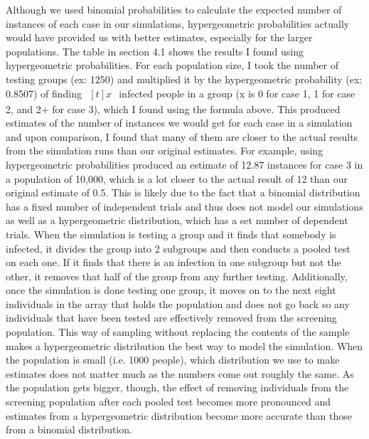 \documentclass[letterpaper, 10pt,DIV=13]{scrartcl}
\numberwithin{equation}{section} %
\numberwithin{figure}{section} %
\numberwithin{table}{section} %
\begin{document}
Although we used binomial probabilities to calculate the expected number of instances of each case in our simulations, hypergeometric probabilities actually would have provided us with better estimates, especially for the larger populations. The table in section 4.1 shows the results I found using hypergeometric probabilities. For each population size, I took the number of testing groups (ex: 1250) and multiplied it by the hypergeometric probability (ex: 0.8507) of finding $\begin{aligned}[t] x \end{aligned}$ infected people in a group (x is 0 for case 1, 1 for case 2, and 2+ for case 3), which I found using the formula above. This produced estimates of the number of instances we would get for each case in a simulation and upon comparison, I found that many of them are closer to the actual results from the simulation runs than our original estimates. For example, using hypergeometric probabilities produced an estimate of 12.87 instances for case 3 in a population of 10,000, which is a lot closer to the actual result of 12 than our original estimate of 0.5. This is likely due to the fact that a binomial distribution has a fixed number of independent trials and thus does not model our simulations as well as a hypergeometric distribution, which has a set number of dependent trials. When the simulation is testing a group and it finds that somebody is infected, it divides the group into 2 subgroups and then conducts a pooled test on each one. If it finds that there is an infection in one subgroup but not the other, it removes that half of the group from any further testing. Additionally, once the simulation is done testing one group, it moves on to the next eight individuals in the array that holds the population and does not go back so any individuals that have been tested are effectively removed from the screening population. This way of sampling without replacing the contents of the sample makes a hypergeometric distribution the best way to model the simulation. When the population is small (i.e. 1000 people), which distribution we use to make estimates does not matter much as the numbers come out roughly the same. As the population gets bigger, though, the effect of removing individuals from the screening population after each pooled test becomes more pronounced and estimates from a hypergeometric distribution become more accurate than those from a binomial distribution.
\end{document}
